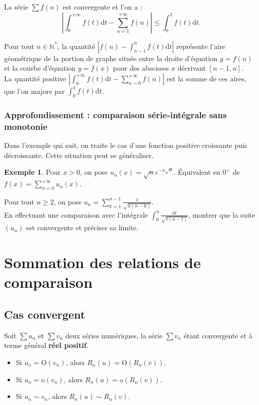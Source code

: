 \documentclass[french]{article}
\newcommand{\N}{\mathbb{N}}
\newcommand{\st}{^*}
\renewcommand{\o}{\text{o}}
\renewcommand{\O}{\text{O}}
\renewcommand{\d}{\text{d}}
\theoremstyle{plain}
\theoremstyle{definition}
\newtheorem*{ex}{Exemple}
\theoremstyle{remark}
\begin{document}
\begin{prop}%
	La série $\displaystyle\sum f(n)$ est convergente et l'on a : $$\left\lvert\int_{0}^{+\infty}f(t)\d t-\sum_{n=1}^{+\infty}f(n)\right\rvert\leqslant\int_{0}^{1}f(t)\d t.$$
\end{prop}

Pour tout $n\in\N\st$, la quantité $\displaystyle\left\lvert f(n)-\int_{n-1}^{n}f(t)\d t\right\rvert$ représente l'aire géométrique de la portion de graphe située entre la droite d'équation $y=f(n)$ et la courbe d'équation $y=f(x)$ pour des abscisses $x$ décrivant $[n-1,n]$. \\

La quantité positive $\displaystyle\left\lvert\int_{0}^{+\infty}f(t)\d t-\sum_{n=0}^{+\infty}f(n)\right\rvert$ est la somme de ces aires, que l'on majore par $\displaystyle\int_{0}^{1}f(t)\d t$.

\subsubsection*{Approfondissement : comparaison série-intégrale sans monotonie}

Dans l'exemple qui suit, on traite le cas d'une fonction positive croissante puis décroissante. Cette situation peut se généraliser.

\begin{ex}
	Pour $x>0$, on pose $u_n(x)=\sqrt{n}e^{-x\sqrt{n}}$. Équivalent en $0^+$ de $f(x)=\displaystyle\sum_{n=0}^{+\infty}u_n(x)$.
\end{ex}

\begin{exo}
	Pour tout $n\geqslant 2$, on pose $u_n=\displaystyle\sum_{k=1}^{n-1}\frac{1}{\sqrt{k(n-k)}}$. \\
	En effectuant une comparaison avec l'intégrale $\displaystyle\int_{0}^{n}\frac{\d t}{\sqrt{t(n-t)}}$, montrer que la suite $(u_n)$ est convergente et préciser sa limite.
\end{exo}

\section{Sommation des relations de comparaison}

\subsection{Cas convergent}

\begin{thm}
	Soit $\displaystyle\sum u_n$ et $\displaystyle\sum v_n$ deux séries numériques, la série $\displaystyle \sum v_n$ étant convergente et à terme général \textbf{réel positif}.
	\begin{itemize}
		\item Si $u_n=\O(v_n)$, alors $R_n(u)=\O(R_n(v))$.
		\item Si $u_n=\o(v_n)$, alors $R_n(u)=\o(R_n(v))$.
		\item Si $u_n\sim v_n$, alors $R_n(u)\sim R_n(v)$.
	\end{itemize}
\end{thm}
\end{document}
